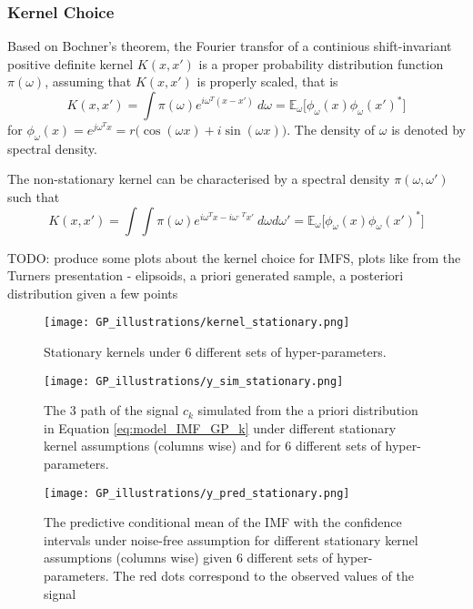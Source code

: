 \subsubsection{Kernel Choice}
Based on Bochner's theorem, the Fourier transfor of a continious shift-invariant positive definite kernel $K(x,x')$ is a proper probability distribution function $\pi(\omega)$, assuming that $K(x,x')$ is properly scaled, that is
\begin{equation}
K(x,x') = \int \pi(\omega) e^{ i \omega^T (x - x') }\ d\omega = \mathbb{E}_{\omega}\big[ \phi_\omega (x) \phi_\omega (x')^* \big] 
\end{equation}
for $\phi_\omega (x)  =e^{j \omega^T x} = r \big( \cos (\omega x ) + i \sin (\omega x )\big)$. The density of $\omega$ is denoted by spectral density. 


The non-stationary kernel can be characterised by a spectral density $\pi(\omega,\omega')$ such that
\begin{equation}
K(x,x') =\int \int \pi(\omega) e^{ i \omega^T x - i \omega^{, \ T} x' }\ d\omega d\omega' = \mathbb{E}_{\omega}\big[ \phi_\omega (x) \phi_\omega (x')^* \big] 
\end{equation}


TODO: produce some plots about the kernel choice for IMFS, plots like from the Turners presentation - elipsoids, a priori generated sample, a posteriori distribution given a few points


\begin{figure}[H]
\centering
\texttt{[image: GP\_illustrations/kernel\_stationary.png]}
\caption{Stationary kernels under 6 different sets of hyper-parameters.}\label{fig:}
\end{figure}

\begin{figure}[H]
\centering
\texttt{[image: GP\_illustrations/y\_sim\_stationary.png]}
\caption{The 3 path of the signal $c_k$ simulated from the a priori distribution in Equation \eqref{eq:model_IMF_GP_k} under different stationary kernel assumptions (columns wise) and for 6 different sets of hyper-parameters.}\label{fig:}
\end{figure}

\begin{figure}[H]
\centering
\texttt{[image: GP\_illustrations/y\_pred\_stationary.png]}
\caption{The predictive conditional mean of the IMF with the confidence intervals  under  noise-free assumption for different stationary kernel assumptions (columns wise) given 6 different sets of hyper-parameters. The red dots correspond to the observed values of the signal}\label{fig:}
\end{figure}
